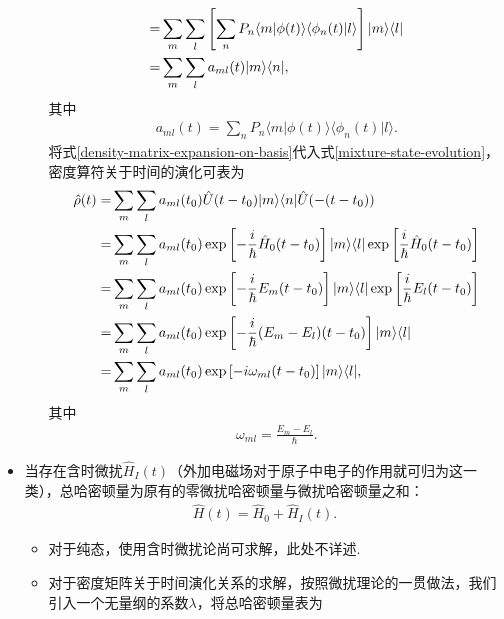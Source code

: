 \documentclass{assignment}
\begin{document}
\begin{itemize}
\begin{itemize}
\begin{align}
            \notag=&\sum_m\sum_l\left[\sum_nP_n\langle m\vert\phi(t)\rangle\langle\phi_n(t)\vert l\rangle\right]\lvert m\rangle\langle l\rvert\\
            =&\sum_m\sum_la_{ml}(t)\lvert m\rangle\langle n\rvert,
        \end{align}
        其中
        \begin{align}
            a_{ml}(t)=\sum_nP_n\langle m\vert\phi(t)\rangle\langle\phi_n(t)\vert l\rangle.
        \end{align}
        将式\eqref{density-matrix-expansion-on-basis}代入式\eqref{mixture-state-evolution}，密度算符关于时间的演化可表为
        \begin{align}
            \label{density-matrix-evolution-without-perturbation}
            \notag\hat{\rho}(t)=&\sum_m\sum_la_{ml}(t_0)\hat{U}(t-t_0)\lvert m\rangle\langle n\rvert\hat{U}(-(t-t_0))\\
            \notag=&\sum_m\sum_la_{ml}(t_0)\exp\left[-\frac{i}{\hbar}\hat{H}_0(t-t_0)\right]\lvert m\rangle\langle l\rvert\exp\left[\frac{i}{\hbar}\hat{H}_0(t-t_0)\right]\\
            \notag=&\sum_m\sum_la_{ml}(t_0)\exp\left[-\frac{i}{\hbar}E_m(t-t_0)\right]\lvert m\rangle\langle l\rvert\exp\left[\frac{i}{\hbar}E_l(t-t_0)\right]\\
            \notag=&\sum_m\sum_la_{ml}(t_0)\exp\left[-\frac{i}{\hbar}(E_m-E_l)(t-t_0)\right]\lvert m\rangle\langle l\rvert\\
            =&\sum_m\sum_la_{ml}(t_0)\exp\left[-i\omega_{ml}(t-t_0)\right]\lvert m\rangle\langle l\rvert,
        \end{align}
        其中
        \begin{align}
            \omega_{ml}=\frac{E_m-E_l}{\hbar}.
        \end{align}
    \end{itemize}
    \item 当存在含时微扰$\hat{H}_I(t)$（外加电磁场对于原子中电子的作用就可归为这一类），总哈密顿量为原有的零微扰哈密顿量与微扰哈密顿量之和：
    \begin{align}
        \label{time-dep-Hamiltonian}
        \hat{H}(t)=\hat{H}_0+\hat{H}_I(t).
    \end{align}
    \begin{itemize}
        \item 对于纯态，使用含时微扰论尚可求解，此处不详述.
        \item 对于密度矩阵关于时间演化关系的求解，按照微扰理论的一贯做法，我们引入一个无量纲的系数$\lambda$，将总哈密顿量表为

\end{itemize}
\end{itemize}
\end{document}
